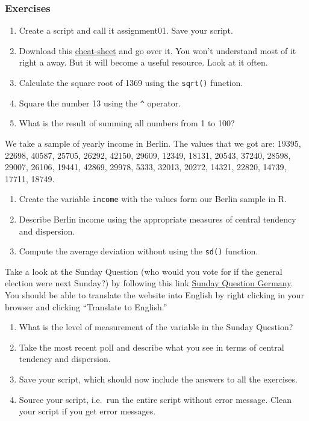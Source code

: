 \documentclass[]{article}
\providecommand{\tightlist}{%
  \setlength{\itemsep}{0pt}\setlength{\parskip}{0pt}}
\begin{document}
\hypertarget{exercises}{%
\subsubsection{Exercises}\label{exercises}}

\begin{enumerate}
\def\labelenumi{\arabic{enumi}.}
\tightlist
\item
  Create a script and call it assignment01. Save your script.
\item
  Download this \href{https://www.rstudio.com/wp-content/uploads/2016/06/r-cheat-sheet.pdf}{cheat-sheet} and go over it. You won't understand most of it right a away. But it will become a useful resource. Look at it often.
\item
  Calculate the square root of 1369 using the \texttt{sqrt()} function.
\item
  Square the number 13 using the \texttt{\^{}} operator.
\item
  What is the result of summing all numbers from 1 to 100?
\end{enumerate}

We take a sample of yearly income in Berlin. The values that we got are: 19395, 22698, 40587, 25705, 26292, 42150, 29609, 12349, 18131, 20543, 37240, 28598, 29007, 26106, 19441, 42869, 29978, 5333, 32013, 20272, 14321, 22820, 14739, 17711, 18749.

\begin{enumerate}
\def\labelenumi{\arabic{enumi}.}
\setcounter{enumi}{5}
\tightlist
\item
  Create the variable \texttt{income} with the values form our Berlin sample in R.
\item
  Describe Berlin income using the appropriate measures of central tendency and dispersion.
\item
  Compute the average deviation without using the \texttt{sd()} function.
\end{enumerate}

Take a look at the Sunday Question (who would you vote for if the general election were next Sunday?) by following this link \href{https://www.wahlrecht.de/umfragen/}{Sunday Question Germany}. You should be able to translate the website into English by right clicking in your browser and clicking ``Translate to English.''

\begin{enumerate}
\def\labelenumi{\arabic{enumi}.}
\setcounter{enumi}{8}
\tightlist
\item
  What is the level of measurement of the variable in the Sunday Question?
\item
  Take the most recent poll and describe what you see in terms of central tendency and dispersion.
\item
  Save your script, which should now include the answers to all the exercises.
\item
  Source your script, i.e.~run the entire script without error message. Clean your script if you get error messages.
\end{enumerate}
\end{document}
